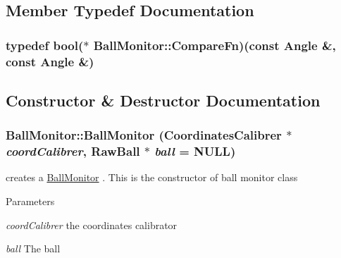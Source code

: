 \subsection{Member Typedef Documentation}
\hypertarget{classBallMonitor_a5ad781c99d5b43bee7c838de9da75527}{
\subsubsection[{CompareFn}]{\setlength{\rightskip}{0pt plus 5cm}typedef bool($\ast$ {\bf BallMonitor::CompareFn})(const {\bf Angle} \&, const {\bf Angle} \&)}}
\label{classBallMonitor_a5ad781c99d5b43bee7c838de9da75527}


\subsection{Constructor \& Destructor Documentation}
\hypertarget{classBallMonitor_a176a257973eefa572b6972aa6b5a605d}{
\subsubsection[{BallMonitor}]{\setlength{\rightskip}{0pt plus 5cm}BallMonitor::BallMonitor ({\bf CoordinatesCalibrer} $\ast$ {\em coordCalibrer}, \/  RawBall $\ast$ {\em ball} = {\ttfamily NULL})}}
\label{classBallMonitor_a176a257973eefa572b6972aa6b5a605d}


creates a \hyperlink{classBallMonitor}{BallMonitor} . This is the constructor of ball monitor class 


\begin{DoxyParams}{Parameters}
\item[{\em coordCalibrer}]the coordinates calibrator \item[{\em ball}]The ball \end{DoxyParams}


